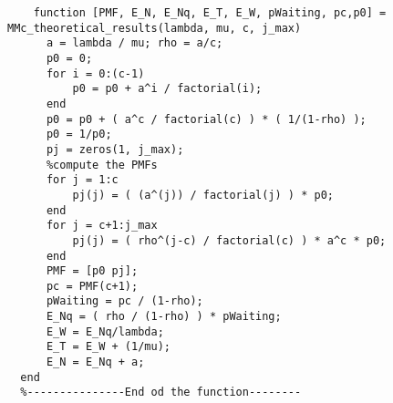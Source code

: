   \begin{lstlisting}[style=Matlab-editor, basicstyle=\ttfamily\footnotesize]
    %------------Theoretical results-------------
    function [PMF, E_N, E_Nq, E_T, E_W, pWaiting, pc,p0] = MMc_theoretical_results(lambda, mu, c, j_max)
      a = lambda / mu; rho = a/c;
      p0 = 0;
      for i = 0:(c-1)
          p0 = p0 + a^i / factorial(i);
      end 
      p0 = p0 + ( a^c / factorial(c) ) * ( 1/(1-rho) );
      p0 = 1/p0;
      pj = zeros(1, j_max);
      %compute the PMFs
      for j = 1:c
          pj(j) = ( (a^(j)) / factorial(j) ) * p0;
      end 
      for j = c+1:j_max
          pj(j) = ( rho^(j-c) / factorial(c) ) * a^c * p0;
      end 
      PMF = [p0 pj];
      pc = PMF(c+1); 
      pWaiting = pc / (1-rho);
      E_Nq = ( rho / (1-rho) ) * pWaiting;
      E_W = E_Nq/lambda;
      E_T = E_W + (1/mu);
      E_N = E_Nq + a;
  end
  %---------------End od the function--------
  \end{lstlisting}
  
